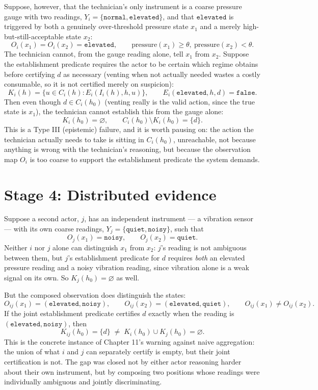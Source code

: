 \documentclass[11pt]{report}
\theoremstyle{definition}
\theoremstyle{plain}
\begin{document}
Suppose, however, that the technician's only instrument is a coarse pressure gauge with two readings, $Y_i = \{\texttt{normal}, \texttt{elevated}\}$, and that $\texttt{elevated}$ is triggered by both a genuinely over-threshold pressure state $x_1$ and a merely high-but-still-acceptable state $x_2$:
\[
O_i(x_1) = O_i(x_2) = \texttt{elevated}, \qquad \text{pressure}(x_1) \geq \theta,\ \text{pressure}(x_2) < \theta.
\]
The technician cannot, from the gauge reading alone, tell $x_1$ from $x_2$. Suppose the establishment predicate requires the actor to be certain which regime obtains before certifying $d$ as necessary (venting when not actually needed wastes a costly consumable, so it is not certified merely on suspicion):
\[
K_i(h) = \{u \in C_i(h) : E_i(I_i(h),h,u)\}, \qquad E_i(\texttt{elevated},h,d) = \texttt{false}.
\]
Then even though $d \in C_i(h_0)$ (venting really is the valid action, since the true state is $x_1$), the technician cannot establish this from the gauge alone:
\[
K_i(h_0) = \varnothing, \qquad C_i(h_0) \setminus K_i(h_0) = \{d\}.
\]
This is a Type III (epistemic) failure, and it is worth pausing on: the action the technician actually needs to take is sitting in $C_i(h_0)$, unreachable, not because anything is wrong with the technician's reasoning, but because the observation map $O_i$ is too coarse to support the establishment predicate the system demands.

\section*{Stage 4: Distributed evidence}

Suppose a second actor, $j$, has an independent instrument --- a vibration sensor --- with its own coarse readings, $Y_j = \{\texttt{quiet}, \texttt{noisy}\}$, such that
\[
O_j(x_1) = \texttt{noisy}, \qquad O_j(x_2) = \texttt{quiet}.
\]
Neither $i$ nor $j$ alone can distinguish $x_1$ from $x_2$: $j$'s reading is not ambiguous between them, but $j$'s establishment predicate for $d$ requires \emph{both} an elevated pressure reading and a noisy vibration reading, since vibration alone is a weak signal on its own. So $K_j(h_0) = \varnothing$ as well.

But the composed observation does distinguish the states:
\[
O_{ij}(x_1) = (\texttt{elevated}, \texttt{noisy}), \qquad O_{ij}(x_2) = (\texttt{elevated}, \texttt{quiet}), \qquad O_{ij}(x_1) \neq O_{ij}(x_2).
\]
If the joint establishment predicate certifies $d$ exactly when the reading is $(\texttt{elevated}, \texttt{noisy})$, then
\[
K_{ij}(h_0) = \{d\} \;\neq\; K_i(h_0) \cup K_j(h_0) = \varnothing.
\]
This is the concrete instance of Chapter 11's warning against naive aggregation: the union of what $i$ and $j$ can separately certify is empty, but their joint certification is not. The gap was closed not by either actor reasoning harder about their own instrument, but by composing two positions whose readings were individually ambiguous and jointly discriminating.
\end{document}
